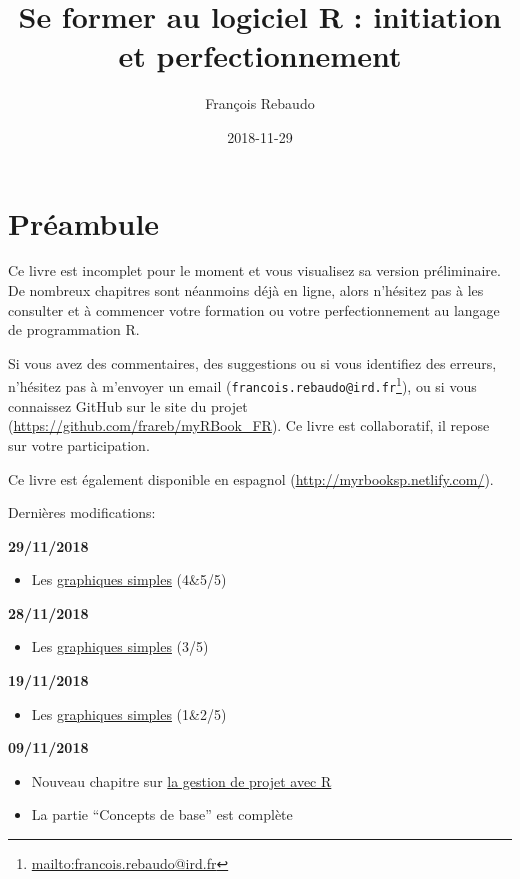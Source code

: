 \documentclass[]{book}
\title{Se former au logiciel R : initiation et perfectionnement}
\author{François Rebaudo}
\date{2018-11-29}
\providecommand{\tightlist}{%
  \setlength{\itemsep}{0pt}\setlength{\parskip}{0pt}}
\let\rmarkdownfootnote\footnote%
\def\footnote{\protect\rmarkdownfootnote}
\renewcommand{\href}[2]{#2\footnote{\url{#1}}}
\theoremstyle{definition}
\theoremstyle{definition}
\theoremstyle{definition}
\theoremstyle{remark}
\begin{document}
\maketitle

{
\setcounter{tocdepth}{1}
\tableofcontents
}
\chapter{Préambule}\label{preambule}

Ce livre est incomplet pour le moment et vous visualisez sa version
préliminaire. De nombreux chapitres sont néanmoins déjà en ligne, alors
n'hésitez pas à les consulter et à commencer votre formation ou votre
perfectionnement au langage de programmation R.

Si vous avez des commentaires, des suggestions ou si vous identifiez des
erreurs, n'hésitez pas à m'envoyer un email
(\href{mailto:francois.rebaudo@ird.fr}{\nolinkurl{francois.rebaudo@ird.fr}}),
ou si vous connaissez GitHub sur le site du projet
(\url{https://github.com/frareb/myRBook_FR}). Ce livre est collaboratif,
il repose sur votre participation.

Ce livre est également disponible en espagnol
(\url{http://myrbooksp.netlify.com/}).

Dernières modifications:

\textbf{29/11/2018}

\begin{itemize}
\tightlist
\item
  Les \protect\hyperlink{graph1}{graphiques simples} (4\&5/5)
\end{itemize}

\textbf{28/11/2018}

\begin{itemize}
\tightlist
\item
  Les \protect\hyperlink{graph1}{graphiques simples} (3/5)
\end{itemize}

\textbf{19/11/2018}

\begin{itemize}
\tightlist
\item
  Les \protect\hyperlink{graph1}{graphiques simples} (1\&2/5)
\end{itemize}

\textbf{09/11/2018}

\begin{itemize}
\tightlist
\item
  Nouveau chapitre sur \protect\hyperlink{project}{la gestion de projet
  avec R}
\item
  La partie ``Concepts de base'' est complète
\end{itemize}
\end{document}
